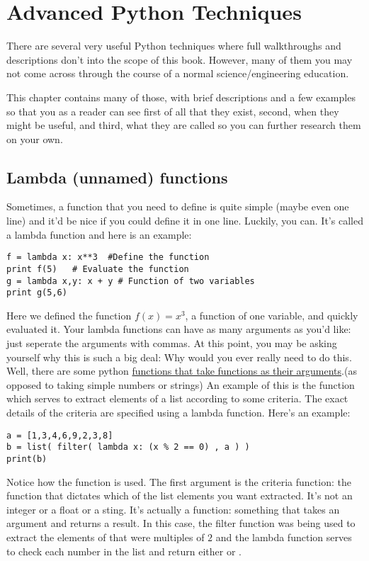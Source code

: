 \chapter{Advanced Python Techniques}
There are several very useful Python techniques where full walkthroughs and descriptions don't into the scope of this book.  However, many of them you may not come across through the course of a normal science/engineering education.

This chapter contains many of those, with brief descriptions and a few examples so that you as a reader can see first of all that they exist, second, when they might be useful, and third, what they are called so you can further research them on your own.

\section{Lambda (unnamed) functions}
Sometimes, a function that you need to
define is quite simple (maybe even one line) and it'd be nice if you
could define it in one line.  Luckily, you can.  It's
called a lambda function and here is an example:
\begin{Verbatim}
f = lambda x: x**3  #Define the function
print f(5)   # Evaluate the function
g = lambda x,y: x + y # Function of two variables
print g(5,6)
\end{Verbatim}
Here we defined the function $f(x) = x^3$, a function of one variable,
and quickly evaluated it.  Your lambda functions can have as many
arguments as you'd like: just seperate the arguments with commas.  At
this point, you may be asking yourself why this is such a big deal:
Why would you ever really need to do this.  Well, there are some
python \underline{functions that take functions as their
  arguments}.(as opposed
to taking simple numbers or strings) An example of this is the
 function which serves to extract elements of a list
according to some criteria.  The exact details of the criteria are
specified using a lambda function.  Here's an example:
\begin{Verbatim}
a = [1,3,4,6,9,2,3,8]
b = list( filter( lambda x: (x % 2 == 0) , a ) )
print(b)
\end{Verbatim}
Notice how the  function is used.  The first argument
is the criteria function: the function that dictates which of the list
elements you want extracted. It's not an integer or a float or a
sting.  It's actually a function: something that takes an argument and
returns a result.  In this case, the filter function was being used to
extract the elements of  that were multiples of $2$ and the
lambda function serves to check each number in the list and return
either  or .

